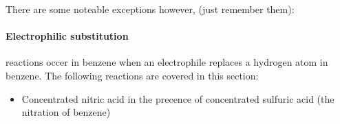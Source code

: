 	There are some noteable exceptions however, (just remember them):
	
	\begin{center}
	    \hspace{1.5cm}
	    \hspace{1.5cm}
	    
	    \vspace{2cm}
	\end{center}
	
	\paragraph{Electrophilic substitution} reactions occer in benzene when an electrophile replaces a hydrogen atom in benzene. The following reactions are covered in this section:
	
	\begin{itemize}
		\item Concentrated nitric acid in the precence of concentrated sulfuric acid (the nitration of benzene)
		
		  
		
	\end{itemize}
